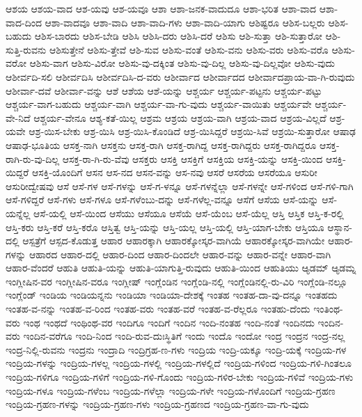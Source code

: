 {ಆಶಯ
ಆಶಯ-ವಾದ
ಆಶ-ಯವು
ಆಶ-ಯವೂ
ಆಶಾ
ಆಶಾ-ಜನಕ-ವಾದುದೂ
ಆಶಾ-ಭರಿತ
ಆಶಾ-ವಾದ
ಆಶಾ-ವಾದ-ದಿಂದ
ಆಶಾ-ವಾದವೂ
ಆಶಾ-ವಾದಿ
ಆಶಾ-ವಾದಿ-ಗಳು
ಆಶಾ-ವಾದಿ-ಯಾಗು
ಆಶಿಷ್ಟರೂ
ಆಶಿಸ-ಬಲ್ಲರು
ಆಶಿಸ-ಬಹುದು
ಆಶಿಸ-ಬಾರದು
ಆಶಿಸ-ಬೇಡಿ
ಆಶಿಸಿ
ಆಶಿಸಿ-ದರು
ಆಶಿಸಿ-ದರೆ
ಆಶಿಸು
ಆಶಿ-ಸುತ್ತಾ
ಆಶಿ-ಸುತ್ತಾರೋ
ಆಶಿ-ಸುತ್ತಿ-ರುವನು
ಆಶಿಸುತ್ತೇನೆ
ಆಶಿಸು-ತ್ತೇವೆ
ಆಶಿ-ಸುವ
ಆಶಿಸು-ವಂತೆ
ಆಶಿಸು-ವನು
ಆಶಿಸು-ವರು
ಆಶಿಸು-ವರೊ
ಆಶಿಸು-ವರೋ
ಆಶಿಸು-ವಾಗ
ಆಶಿಸು-ವಿರೋ
ಆಶಿಸು-ವು-ದಕ್ಕಿಂತ
ಆಶಿಸು-ವು-ದಿಲ್ಲ
ಆಶಿಸು-ವು-ದಿಲ್ಲವೋ
ಆಶಿಸು-ವುದು
ಆಶೀರ್ವದಿ-ಸಲಿ
ಆಶೀರ್ವದಿಸಿ
ಆಶೀರ್ವದಿಸಿ-ದ-ವರು
ಆಶೀರ್ವಾದ
ಆಶೀರ್ವಾದದ
ಆಶೀರ್ವಾದಪ್ರಾಯ-ವಾ-ಗಿ-ರುವುದು
ಆಶೀರ್ವಾ-ದವೆ
ಆಶೀರ್ವಾ-ವನ್ನು
ಆಶೆ
ಆಶೆಯ
ಆಶೆ-ಯನ್ನು
ಆಶ್ಚರ್ಯ
ಆಶ್ಚರ್ಯ-ಪಟ್ಟನು
ಆಶ್ಚರ್ಯ-ಪಟ್ಟು
ಆಶ್ಚರ್ಯ-ವಾಗ-ಬಹುದು
ಆಶ್ಚರ್ಯ-ವಾಗಿ
ಆಶ್ಚರ್ಯ-ವಾ-ಗು-ವುದು
ಆಶ್ಚರ್ಯ-ವಾಯಿತು
ಆಶ್ಚರ್ಯವೇ
ಆಶ್ಚರ್ಯ-ವೇ-ನಿದೆ
ಆಶ್ಚರ್ಯ-ವೇನೂ
ಆಶ್ಯ-ಕತೆ-ಯಿಲ್ಲ
ಆಶ್ರಮ
ಆಶ್ರಯ
ಆಶ್ರಯ-ವಾಗಿ
ಆಶ್ರಯ-ವಾದ
ಆಶ್ರಯ-ವಿಲ್ಲದೆ
ಆಶ್ರ-ಯವೇ
ಆಶ್ರ-ಯಿಸ-ಬೇಕು
ಆಶ್ರ-ಯಿಸಿ
ಆಶ್ರ-ಯಿಸಿ-ಕೊಂಡಿದೆ
ಆಶ್ರ-ಯಿಸಿದ್ದರೆ
ಆಶ್ರಯಿ-ಸಿವೆ
ಆಶ್ರಯಿ-ಸುತ್ತಾರೋ
ಆಷಾಢ
ಆಷಾಢ-ಭೂತಿಯ
ಆಸಕ್ತ-ನಾಗಿ
ಆಸಕ್ತನು
ಆಸಕ್ತ-ರಾಗಿ
ಆಸಕ್ತ-ರಾಗಿದ್ದ
ಆಸಕ್ತ-ರಾಗಿದ್ದರು
ಆಸಕ್ತ-ರಾಗಿದ್ದರೂ
ಆಸಕ್ತ-ರಾಗಿ-ರು-ವು-ದಿಲ್ಲ
ಆಸಕ್ತ-ರಾ-ಗಿ-ರು-ವೆವು
ಆಸಕ್ತರು
ಆಸಕ್ತಿ
ಆಸಕ್ತಿಗೆ
ಆಸಕ್ತಿಯ
ಆಸಕ್ತಿ-ಯನ್ನು
ಆಸಕ್ತಿ-ಯಿಂದ
ಆಸಕ್ತಿ-ಯಿದ್ದರೆ
ಆಸಕ್ತಿ-ಯೊಂದಿಗೆ
ಆಸನ
ಆಸ-ನದ
ಆಸನ-ವನ್ನು
ಆಸ-ನವು
ಆಸರೆ
ಆಸರೆಯ
ಆಸರೆಯೂ
ಆಸುರೀ
ಆಸುರೀದ್ವೇಷವು
ಆಸೆ
ಆಸೆ-ಗಳ
ಆಸೆ-ಗಳನ್ನು
ಆಸೆ-ಗ-ಳನ್ನೂ
ಆಸೆ-ಗಳನ್ನೆಲ್ಲಾ
ಆಸೆ-ಗಳನ್ನೇ
ಆಸೆ-ಗಳಿಂದ
ಆಸೆ-ಗಳಿ-ಗಾಗಿ
ಆಸೆ-ಗಳಿದ್ದರೆ
ಆಸೆ-ಗಳು
ಆಸೆ-ಗಳೂ
ಆಸೆ-ಗಳೆಂಬು-ದನ್ನು
ಆಸೆ-ಗಳೆಲ್ಲ-ವನ್ನೂ
ಆಸೆಗೆ
ಆಸೆಯ
ಆಸೆ-ಯನ್ನು
ಆಸೆ-ಯನ್ನೆಲ್ಲ
ಆಸೆ-ಯಲ್ಲಿ
ಆಸೆ-ಯಿಂದ
ಆಸೆಯು
ಆಸೆಯೂ
ಆಸೆಯೆ
ಆಸೆ-ಯೆಂಬ
ಆಸೆ-ಯೆಲ್ಲ
ಆಸ್ತಿ
ಆಸ್ತಿಕ
ಆಸ್ತಿ-ಕ-ರಲ್ಲಿ
ಆಸ್ತಿ-ಕರು
ಆಸ್ತಿ-ಕರೆ
ಆಸ್ತಿ-ಕರೊ
ಆಸ್ತಿತ್ವ
ಆಸ್ತಿ-ಯನ್ನು
ಆಸ್ತಿ-ಯಲ್ಲ
ಆಸ್ತಿ-ಯಲ್ಲಿ
ಆಸ್ತಿ-ಯಾಗ-ಬೇಕು
ಆಸ್ತಿಯೂ
ಆಸ್ಥಾನ-ದಲ್ಲಿ
ಆಸ್ಪತ್ರೆಗೆ
ಆಸ್ಪದ-ಕೊಡುತ್ತ
ಆಹಾರ
ಆಹಾರಕ್ಕಾಗಿ
ಆಹಾರಕ್ಕೋಸ್ಕರ-ವಾಗಿಯೆ
ಆಹಾರಕ್ಕೋಸ್ಕರ-ವಾಗಿಯೇ
ಆಹಾರ-ಗಳನ್ನು
ಆಹಾರದ
ಆಹಾರ-ದಲ್ಲಿ
ಆಹಾರ-ದಿಂದ
ಆಹಾರ-ದಿಂದಲೇ
ಆಹಾರ-ವನ್ನು
ಆಹಾರ-ವನ್ನೇ
ಆಹಾರ-ವಾಗಿ
ಆಹಾರ-ವೆಂದರೆ
ಆಹುತಿ
ಆಹುತಿ-ಯನ್ನು
ಆಹುತಿ-ಯಾಗುತ್ತಿ-ರುವುದು
ಆಹುತಿ-ಯಿಂದ
ಆಹುತಿಯು
ಆ್ಯಡಮ್
ಆ್ಯಡಮ್ನ
ಇಂಗ್ಲೀಷಿನ-ವರ
ಇಂಗ್ಲೀಷಿನ-ವರೂ
ಇಂಗ್ಲೀಷ್
ಇಂಗ್ಲೆಂಡಿನ
ಇಂಗ್ಲೆಂಡಿ-ನಲ್ಲಿ
ಇಂಗ್ಲೆಂಡಿನಲ್ಲಿ-ರು-ವಿರಿ
ಇಂಗ್ಲೆಂಡಿ-ನಲ್ಲೂ
ಇಂಗ್ಲೆಂಡ್
ಇಂಡಿಯ
ಇಂಡಿಯನ್ನನು
ಇಂಡಿಯಾ
ಇಂಡಿಯಾ-ದೇಶಕ್ಕೆ
ಇಂತಹ
ಇಂತಹ-ದಾ-ವು-ದನ್ನೂ
ಇಂತಹದು
ಇಂತಹ-ವ-ನನ್ನು
ಇಂತಹ-ವ-ರಿಂದ
ಇಂತಹ-ವರು
ಇಂತಹ-ವರೆ
ಇಂತಹ-ವ-ರೆಲ್ಲರೂ
ಇಂತಹು-ದೆಂದು
ಇಂತಿಂಥ-ವರು
ಇಂಥ
ಇಂಥದೆ
ಇಂಥಿಂಥ-ವರ
ಇಂದಿಗೂ
ಇಂದಿಗೆ
ಇಂದಿನ
ಇಂದಿ-ನಂತಹ
ಇಂದಿ-ನಂತೆ
ಇಂದಿನದು
ಇಂದಿನ-ವರು
ಇಂದಿನ-ವರೆಗೂ
ಇಂದಿ-ನಿಂದ
ಇಂದಿ-ರುವ-ದುಃಸ್ಥಿತಿಗೆ
ಇಂದು
ಇಂದೊ
ಇಂದೋ
ಇಂದ್ರ
ಇಂದ್ರನ
ಇಂದ್ರ-ನಲ್ಲ
ಇಂದ್ರ-ನಿಲ್ಲಿ-ರುವನು
ಇಂದ್ರನು
ಇಂದ್ರಾದಿ
ಇಂದ್ರಿಗ್ರಹ-ಣ-ಗಳು
ಇಂದ್ರಿಯ
ಇಂದ್ರಿ-ಯಕ್ಕೂ
ಇಂದ್ರಿ-ಯಕ್ಕೆ
ಇಂದ್ರಿಯ-ಗಳ
ಇಂದ್ರಿಯ-ಗಳನ್ನು
ಇಂದ್ರಿಯ-ಗಳಲ್ಲ
ಇಂದ್ರಿಯ-ಗಳಲ್ಲಿ
ಇಂದ್ರಿಯ-ಗಳಲ್ಲಿದೆ
ಇಂದ್ರಿಯ-ಗಳಿಂದ
ಇಂದ್ರಿಯ-ಗಳಿ-ಗಿಂತಲೂ
ಇಂದ್ರಿಯ-ಗಳಿಗೂ
ಇಂದ್ರಿಯ-ಗಳಿಗೆ
ಇಂದ್ರಿಯ-ಗಳಿ-ಗೊಂದು
ಇಂದ್ರಿಯ-ಗಳಿರ-ಬೇಕು
ಇಂದ್ರಿಯ-ಗಳಿವೆ
ಇಂದ್ರಿಯ-ಗಳು
ಇಂದ್ರಿಯ-ಗಳೂ
ಇಂದ್ರಿಯ-ಗಳೆಂಬ
ಇಂದ್ರಿಯ-ಗಳೆಲ್ಲಾ
ಇಂದ್ರಿಯ-ಗಳೇ
ಇಂದ್ರಿಯ-ಗಳೊಂದಿಗೆ
ಇಂದ್ರಿಯ-ಗ್ರಹಣ
ಇಂದ್ರಿಯ-ಗ್ರಹಣ-ಗಳನ್ನು
ಇಂದ್ರಿಯ-ಗ್ರಹಣ-ಗಳು
ಇಂದ್ರಿಯ-ಗ್ರಹಣದ
ಇಂದ್ರಿಯ-ಗ್ರಹಣ-ವಾ-ಗು-ವುದು
}
